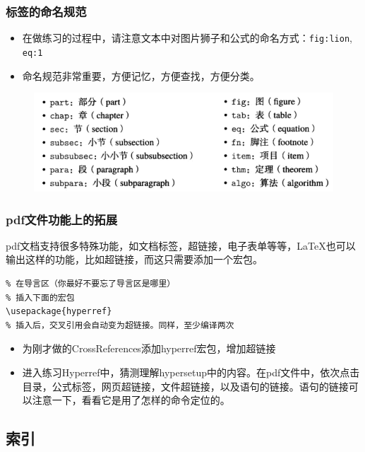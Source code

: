     \begin{frame}[fragile]
        \frametitle{标签的命名规范}
        \begin{itemize}
            \item 在做练习的过程中，请注意文本中对图片狮子和公式的命名方式：\verb|fig:lion|, \verb|eq:1|
            \item 命名规范非常重要，方便记忆，方便查找，方便分类。
        \end{itemize}
        \begin{figure}
        \includegraphics[width=\textwidth]{img//HowToName.png}
        \end{figure}
    \end{frame}
    
    \begin{frame}[fragile]
        \frametitle{pdf文件功能上的拓展}
        pdf文档支持很多特殊功能，如文档标签，超链接，电子表单等等，\LaTeX 也可以输出这样的功能，比如超链接，而这只需要添加一个宏包。
\begin{lstlisting}
% 在导言区（你最好不要忘了导言区是哪里）
% 插入下面的宏包
\usepackage{hyperref}
% 插入后，交叉引用会自动变为超链接。同样，至少编译两次
\end{lstlisting}
        \begin{itemize}
            \item 为刚才做的CrossReferences添加hyperref宏包，增加超链接
            \item 进入练习Hyperref中，猜测理解hypersetup中的内容。在pdf文件中，依次点击目录，公式标签，网页超链接，文件超链接，以及语句的链接。语句的链接可以注意一下，看看它是用了怎样的命令定位的。
        \end{itemize}
    \end{frame}



\subsection{索引}

